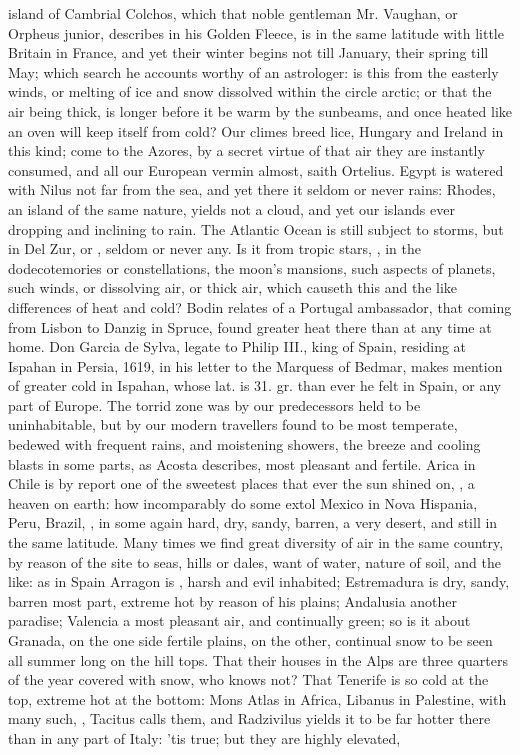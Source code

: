 {island of Cambrial Colchos, which that noble gentleman Mr. Vaughan, or Orpheus junior, describes in his Golden Fleece, is in the same latitude with little Britain in France, and yet their winter begins not till January, their spring till May; which search he accounts worthy of an astrologer: is this from the easterly winds, or melting of ice and snow dissolved within the circle arctic; or that the air being thick, is longer before it be warm by the sunbeams, and once heated like an oven will keep itself from cold? Our climes breed lice, Hungary and Ireland  in this kind; come to the Azores, by a secret virtue of that air they are instantly consumed, and all our European vermin almost, saith Ortelius. Egypt is watered with Nilus not far from the sea, and yet there it seldom or never rains: Rhodes, an island of the same nature, yields not a cloud, and yet our islands ever dropping and inclining to rain. The Atlantic Ocean is still subject to storms, but in Del Zur, or , seldom or never any. Is it from tropic stars, , in the dodecotemories or constellations, the moon's mansions, such aspects of planets, such winds, or dissolving air, or thick air, which causeth this and the like differences of heat and cold? Bodin relates of a Portugal ambassador, that coming from Lisbon to Danzig in Spruce, found greater heat there than at any time at home. Don Garcia de Sylva, legate to Philip III., king of Spain, residing at Ispahan in Persia, 1619, in his letter to the Marquess of Bedmar, makes mention of greater cold in Ispahan, whose lat. is 31. gr. than ever he felt in Spain, or any part of Europe. The torrid zone was by our predecessors held to be uninhabitable, but by our modern travellers found to be most temperate, bedewed with frequent rains, and moistening showers, the breeze and cooling blasts in some parts, as Acosta describes, most pleasant and fertile. Arica in Chile is by report one of the sweetest places that ever the sun shined on, , a heaven on earth: how incomparably do some extol Mexico in Nova Hispania, Peru, Brazil, \etc{}, in some again hard, dry, sandy, barren, a very desert, and still in the same latitude. Many times we find great diversity of air in the same country, by reason of the site to seas, hills or dales, want of water, nature of soil, and the like: as in Spain Arragon is , harsh and evil inhabited; Estremadura is dry, sandy, barren most part, extreme hot by reason of his plains; Andalusia another paradise; Valencia a most pleasant air, and continually green; so is it about Granada, on the one side fertile plains, on the other, continual snow to be seen all summer long on the hill tops. That their houses in the Alps are three quarters of the year covered with snow, who knows not? That Tenerife is so cold at the top, extreme hot at the bottom: Mons Atlas in Africa, Libanus in Palestine, with many such, , Tacitus calls them, and Radzivilus  yields it to be far hotter there than in any part of Italy: 'tis true; but they are highly elevated, }
